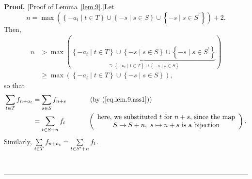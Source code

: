 \documentclass[numbers=enddot,12pt,final,onecolumn,notitlepage]{scrartcl}%
\numberwithin{exer}{section}
\theoremstyle{definition}
\newenvironment{proof}[1][Proof]{\noindent\textbf{#1.} }{\ \rule{0.5em}{0.5em}}
\let\sumnonlimits\sum
\renewcommand{\sum}{\sumnonlimits\limits}
\begin{document}
\begin{proof}
[Proof of Lemma~\ref{lem.9}.]Let%
\[
n=\max\left(  \left\{  -a_{t}\mid t\in T\right\}  \cup\left\{  -s\mid s\in
S\right\}  \cup\left\{  -s\mid s\in S^{\prime}\right\}  \right)  +2.
\]
Then,%
\begin{align*}
n  &  >\max\left(  \underbrace{\left\{  -a_{t}\mid t\in T\right\}
\cup\left\{  -s\mid s\in S\right\}  \cup\left\{  -s\mid s\in S^{\prime
}\right\}  }_{\supseteq\left\{  -a_{t}\mid t\in T\right\}  \cup\left\{  -s\mid
s\in S\right\}  }\right) \\
&  \geq\max\left(  \left\{  -a_{t}\mid t\in T\right\}  \cup\left\{  -s\mid
s\in S\right\}  \right)  ,
\end{align*}
so that%
\begin{align*}
\sum\limits_{t\in T}f_{n+a_{t}}  &  =\sum\limits_{s\in S}f_{n+s}%
\ \ \ \ \ \ \ \ \ \ \left(  \text{by (\ref{eq.lem.9.ass1})}\right) \\
&  =\sum\limits_{t\in S+n}f_{t}\ \ \ \ \ \ \ \ \ \ \left(
\begin{array}
[c]{c}%
\text{here, we substituted }t\text{ for }n+s\text{, since the map}\\
S\rightarrow S+n,\ s\mapsto n+s\text{ is a bijection}%
\end{array}
\right)  .
\end{align*}
Similarly, $\sum\limits_{t\in T}f_{n+a_{t}}=\sum\limits_{t\in S^{\prime}%
+n}f_{t}$.


\end{proof}
\end{document}
